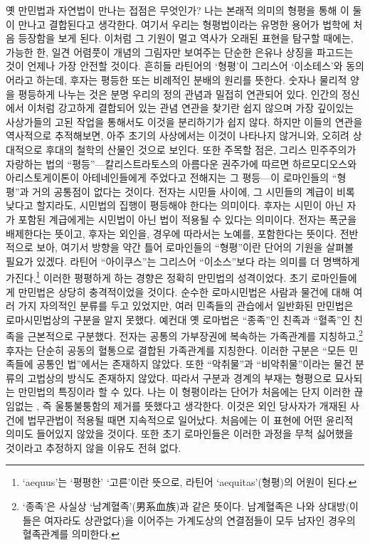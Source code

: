 옛 만민법과 자연법이 만나는 접점은 무엇인가?
나는 본래적 의미의 형평을 통해
이 둘이 만나고 결합된다고 생각한다.
여기서 우리는 형평법이라는 유명한 용어가
법학에 처음 등장함을 보게 된다.
이처럼 그 기원이 멀고 역사가 오래된 표현을 탐구할 때에는,
가능한 한,
일견 어렴풋이 개념의 그림자만 보여주는
단순한 은유나 상징을 파고드는 것이
언제나 가장 안전할 것이다.
흔히들 라틴어의 `형평'이 그리스어 `이소테스'와 동의어라고
하는데, 후자는 평등한 또는 비례적인 분배의 원리를 뜻한다.
숫자나 물리적 양을 평등하게 나누는 것은 분명 우리의 정의 관념과
밀접히 연관되어 있다.
인간의 정신에서 이처럼 강고하게 결합되어 있는 관념 연관을 찾기란 쉽지 않으며
가장 깊이있는 사상가들의 고된 작업을 통해서도 이것을 분리하기가 쉽지 않다.
하지만 이들의 연관을 역사적으로 추적해보면,
아주 초기의 사상에서는 이것이 나타나지 않거니와,
오히려 상대적으로 후대의 철학의 산물인 것으로 보인다.
또한 주목할 점은, 그리스 민주주의가 자랑하는
법의 ``평등''---칼리스트라토스의
아름다운 권주가에 따르면
하르모디오스와 아리스토게이톤이
아테네인들에게 주었다고 전해지는 그 평등---이
로마인들의 ``형평''과 거의 공통점이 없다는 것이다.
전자는 시민들 사이에, 그 시민들의 계급이 비록 낮다고 할지라도,
시민법의 집행이 평등해야 한다는 의미이다.
후자는 시민이 아닌 자가 포함된 계급에게는 시민법이 아닌 법이
적용될 수 있다는 의미이다.
전자는 폭군을 배제한다는 뜻이고, 후자는 외인을, 경우에 따라서는 노예를,
포함한다는 뜻이다.
전반적으로 보아, 여기서 방향을 약간 틀어 로마인들의 ``형평''이란 단어의
기원을 살펴볼 필요가 있겠다.
라틴어 ``아이쿠스''는 그리스어 ``이소스''보다
라는 의미를 더 명백하게 가진다.\footnote{%
  `aequus'는 `평평한' `고른'이란 뜻으로, 라틴어 `aequitas'(형평)의 어원이 된다.}
이러한 평평하게 하는 경향은 정확히 만민법의 성격이었다.
초기 로마인들에게 만민법은 상당히 충격적이었을 것이다.
순수한 로마시민법은 사람과 물건에 대해 여러 가지 자의적인 분류를 두고 있었지만,
여러 민족들의 관습에서 일반화된 만민법은 로마시민법상의 구분을
알지 못했다.
예컨대 옛 로마법은 ``종족''인 친족과
``혈족''인 친족을 근본적으로 구분했다.
전자는 공통의 가부장권에 복속하는 가족관계를
지칭하고,\footnote{`종족'은 사실상 `남계혈족'(男系血族)과 같은 뜻이다.
남계혈족은 나와 상대방(이들은 여자라도 상관없다)을 이어주는
가계도상의 연결점들이 모두 남자인 경우의 혈족관계를 의미한다. }
후자는  단순히 공동의 혈통으로
결합된 가족관계를 지칭한다.
이러한 구분은 ``모든 민족들에 공통인 법''에서는 존재하지 않았다.
또한 ``악취물''과
``비악취물''이라는
물건 분류의 고법상의 방식도 존재하지 않았다.
따라서 구분과 경계의 부재는 형평으로 묘사되는 만민법의
특징이라 할 수 있다.
나는 이 형평이라는 단어가 처음에는 단지
이러한 끊임없는 , 즉
울퉁불퉁함의 제거를 뜻했다고 생각한다.
이것은 외인 당사자가 개재된 사건에 법무관법이 적용될 때면 지속적으로 일어났다.
처음에는 이 표현에 어떤 윤리적 의미도 들어있지 않았을 것이다.
또한 초기 로마인들은 이러한 과정을 무척 싫어했을 것이라고
추정하지 않을 이유도 전혀 없다.

